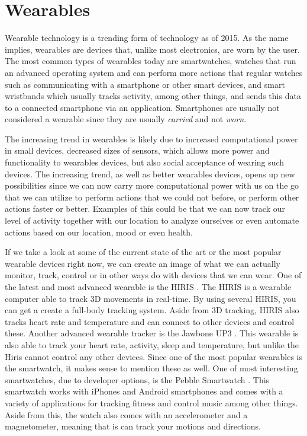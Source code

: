 \section{Wearables}\label{sec:wearables} %
Wearable technology is a trending form of technology as of 2015.  As the name implies, wearables are devices that, unlike most electronics, are worn by the user. The most common types of wearables today are smartwatches, \ie watches that run an advanced operating system and can perform more actions that regular watches such as communicating with a smartphone or other smart devices, and smart wristbands which usually tracks activity, among other things, and sends this data to a connected smartphone via an application. Smartphones are usually not considered a wearable since they are usually \emph{carried} and not \emph{worn}. 

The increasing trend in wearables is likely due to increased computational power in small devices, decreased sizes of sensors, which allows more power and functionality to wearables devices, but also social acceptance of wearing such devices.  The increasing trend, as well as better wearables devices, opens up new possibilities since we can now carry more computational power with us on the go that we can utilize to perform actions that we could not before, or perform other actions faster or better. Examples of this could be that we can now track our level of activity together with our location to analyze ourselves or even automate actions based on our location, mood or even health. 

If we take a look at some of the current state of the art or the most popular wearable devices right now, we can create an image of what we can actually monitor, track, control or in other ways do with devices that we can wear. One of the latest and most advanced wearable is the HIRIS \cite{hirisweb}. The HIRIS is a wearable computer able to track 3D movements in real-time. By using several HIRIS, you can get a create a full-body tracking system. Aside from 3D tracking, HIRIS also tracks heart rate and temperature and can connect to other devices and control these. Another advanced wearable tracker is the Jawbone UP3 \cite{JAWBONE}. This wearable is also able to track your heart rate, activity, sleep and temperature, but unlike the Hiris cannot control any other devices. Since one of the most popular wearables is the smartwatch, it makes sense to mention these as well. One of most interesting smartwatches, due to developer options, is the Pebble Smartwatch \cite{PEBBLE}. This smartwatch works with iPhones and Android smartphones and comes with a variety of applications for tracking fitness and control music among other things. Aside from this, the watch also comes with an accelerometer and a magnetometer, meaning that is can track your motions and directions. 

